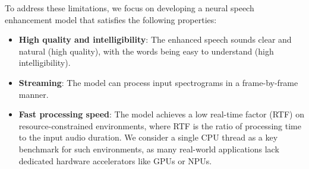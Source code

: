 
To address these limitations, we focus on developing a neural speech enhancement model that satisfies the following properties:
\begin{itemize}[itemsep=0pt,leftmargin=1em]
    \item \textbf{High quality and intelligibility}: The enhanced speech sounds clear and natural (high quality), with the words being easy to understand (high intelligibility).
    \item \textbf{Streaming}: The model can process input spectrograms in a frame-by-frame manner.
    \item \textbf{Fast processing speed}: The model achieves a low real-time factor (RTF) on resource-constrained environments, where RTF is the ratio of processing time to the input audio duration. We consider a single CPU thread as a key benchmark for such environments, as many real-world applications lack dedicated hardware accelerators like GPUs or NPUs.
\end{itemize}

